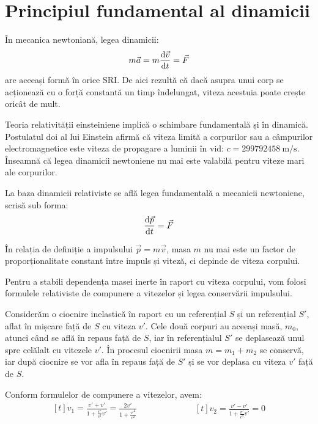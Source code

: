 \section{Principiul fundamental al dinamicii}

În mecanica newtoniană, legea dinamicii:
\[ m\vec{a} = m\dv{\vec{v}}{t} = \vec{F} \]
are aceeași formă în orice SRI. De aici rezultă că dacă asupra unui corp se
acționează cu o forță constantă un timp îndelungat, viteza acestuia poate
crește oricât de mult.

Teoria relativității einsteiniene implică o schimbare fundamentală și în
dinamică. Postulatul doi al lui Einstein afirmă că viteza limită a corpurilor
sau a câmpurilor electromagnetice este viteza de propagare a luminii în vid:
\( c = 299792458 ~ \mathrm{m/s} \).
Înseamnă că legea dinamicii newtoniene nu mai este valabilă pentru viteze mari
ale corpurilor.

La baza dinamicii relativiste se află legea fundamentală a mecanicii newtoniene,
scrisă sub forma:
\[ \dv{\vec{p}}{t} = \vec{F} \]

În relația de definiție a impulsului \( \vec{p} = m\vec{v} \), masa $m$ nu mai
este un factor de proporționalitate constant între impuls și viteză, ci depinde
de viteza corpului.

Pentru a stabili dependența masei inerte în raport cu viteza corpului, vom folosi
formulele relativiste de compunere a vitezelor și legea conservării impulsului.

\pagebreak

Considerăm o ciocnire inelastică în raport cu un referențial $S$ și un
referențial $S'$, aflat în mișcare față de $S$ cu viteza $v'$. Cele două
corpuri au aceeași masă, $m_0$, atunci când se află în repaus față de $S$, iar în
referențialul $S'$ se deplasează unul spre celălalt cu vitezele $v'$. În
procesul ciocnirii masa \( m = m_1 + m_2 \) se conservă, iar după ciocnire
se vor afla în repaus față de $S'$ și se vor deplasa cu viteza $v'$ față de
$S$.

Conform formulelor de compunere a vitezelor, avem:
\begin{equation*}
    \begin{aligned}[t]
        v_1 = \frac{v' + v'}{1 + \frac{v'}{c^2}v'} = \frac{2v'}{1 + \frac{v'^2}{c^2}}
    \end{aligned}
    \qquad\qquad\qquad
    \begin{aligned}[t]
        v_2 = \frac{v' - v'}{1 + \frac{v'}{c^2}v'} = 0
    \end{aligned}
\end{equation*}

